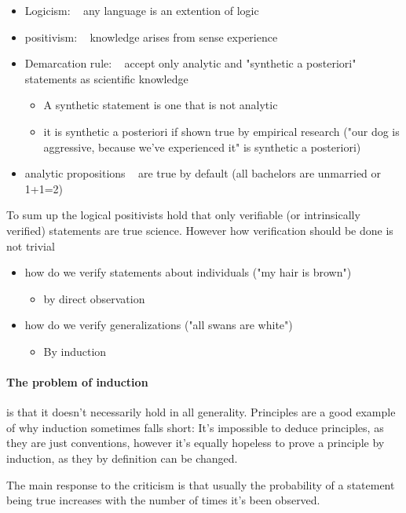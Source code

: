 \documentclass[12pt, a4paper]{article}
\begin{document}
\begin{multicols}{2}
\begin{itemize}
\item Logicism: ~ any language is an extention of logic
\item positivism: ~ knowledge arises from sense experience
\item Demarcation rule: ~ accept only analytic and "synthetic a posteriori" statements as scientific knowledge
\begin{itemize}
\item A synthetic statement is one that is not analytic
\item it is synthetic a posteriori if shown true by empirical research ("our dog is aggressive, because we've experienced it" is synthetic a posteriori)
\end{itemize}
\item analytic propositions ~ are true by default (all bachelors are unmarried or 1+1=2)
\end{itemize}
To sum up the logical positivists hold that only verifiable (or intrinsically verified) statements are true science. However how verification should be done is not trivial
\begin{itemize}
\item[1)] how do we verify statements about individuals ("my hair is brown")
\begin{itemize}
\item by direct observation
\end{itemize}
\item[2)] how do we verify generalizations ("all swans are white")
\begin{itemize}
\item By induction 
\end{itemize}
\end{itemize}

\paragraph{The problem of induction} is that it doesn't necessarily hold in all generality. Principles are a good example of why induction sometimes falls short: It's impossible to deduce principles, as they are just conventions, however it's equally hopeless to prove a principle by induction, as they by definition can be changed. 

The main response to the criticism is that usually the probability of a statement being true increases with the number of times it's been observed. 


\end{multicols}
\end{document}
